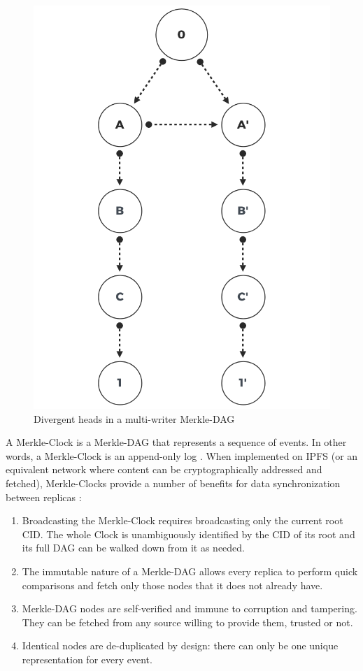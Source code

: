 \documentclass{textile}
\begin{document}
\begin{figure}
  \includegraphics[width=\linewidth]{figures/Divergent_Heads.png}
  \caption{Divergent heads in a multi-writer Merkle-DAG }
  \label{fig:merkledag}
\end{figure}

A Merkle-Clock is a Merkle-DAG that represents a sequence of events. In other words, a Merkle-Clock is an append-only log \cite{sanjuanMerkleCRDTs2019}. When implemented on IPFS (or an equivalent network where content can be cryptographically addressed and fetched), Merkle-Clocks provide a number of benefits for data synchronization between replicas \cite[sec. 4.3]{sanjuanMerkleCRDTs2019}:

\begin{enumerate}
\item Broadcasting the Merkle-Clock requires broadcasting only the current root CID. The whole Clock is unambiguously identified by the CID of its root and its full DAG can be walked down from it as needed.
\item The immutable nature of a Merkle-DAG allows every replica to perform quick comparisons and fetch only those nodes that it does not already have.
\item Merkle-DAG nodes are self-verified and immune to corruption and tampering. They can be fetched from any source willing to provide them, trusted or not.
\item Identical nodes are de-duplicated by design: there can only be one unique representation for every event.
\end{enumerate}
\end{document}
